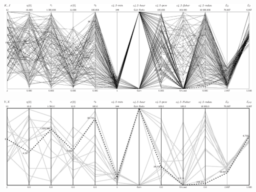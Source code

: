 \documentclass{article}
\begin{document}
\centerline{\includegraphics[width=\textwidth]{hybridSOM-c4-5_iris_generalization}}

\hspace{3cm}

\centerline{\includegraphics[width=\textwidth]{hybridSOM-c4-5_iris_conditions}}
\end{document}
